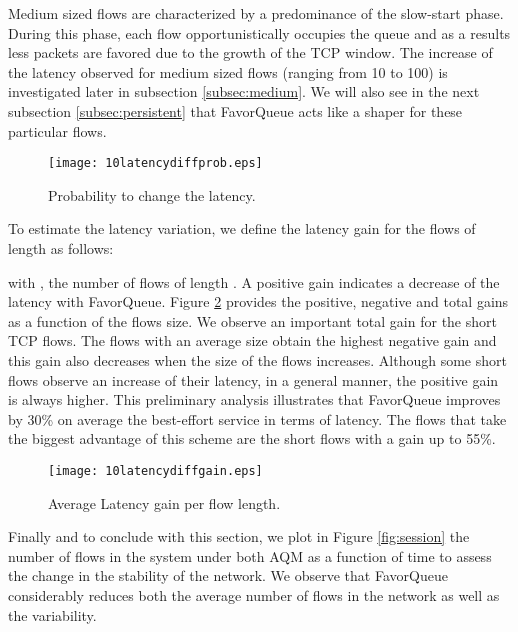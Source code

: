 \documentclass{elsart}
\begin{document}
Medium sized flows are characterized by a predominance of the slow-start phase. During this phase, each flow opportunistically occupies the queue and as a results less packets are favored due to the growth of the TCP window. The increase of the latency observed for medium sized flows (ranging from 10 to 100) is investigated later in subsection \ref{subsec:medium}. We will also see in the next subsection \ref{subsec:persistent} that FavorQueue acts like a shaper for these particular flows.

\begin{figure}[ht]
\begin{center}
\texttt{[image: 10latencydiffprob.eps]}
\end{center}
\caption{Probability to change the latency.}
\label{fig:diffprob}
\end{figure}

To estimate the latency variation, we define  the latency gain for the flows of length  as follows:



with , the number of flows of length . A positive gain indicates a decrease of the latency with FavorQueue. 
Figure \ref{fig:diffgain} provides the positive, negative and total gains as a function of the flows size. We observe an important total gain for the short TCP flows. 
The flows with an average size obtain the highest negative gain and this gain also decreases when the size of the flows increases.
Although some short flows observe an increase of their latency, in a general manner, the positive gain is always higher. 
This preliminary analysis illustrates that FavorQueue improves by 30\% on average the best-effort service in terms of latency. The flows that take the biggest advantage of this scheme are the short flows with a gain up to 55\%.

\begin{figure}[ht]
\begin{center}
\texttt{[image: 10latencydiffgain.eps]}
\end{center}
\caption{Average Latency gain per flow length.}
\label{fig:diffgain}
\end{figure}

Finally and to conclude with this section, we plot in Figure \ref{fig:session} the number of flows in the system under both AQM as a function of time 
to assess the change in the stability of the network. 
We observe that FavorQueue considerably reduces both the average number of flows in the network as well as the variability. 
\end{document}

